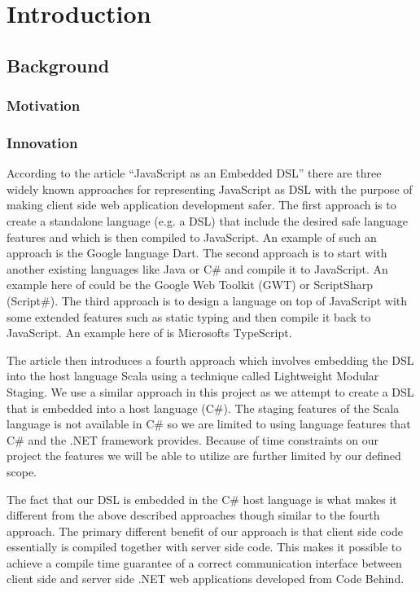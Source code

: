 \chapter{Introduction}

\section{Background}

	\subsection{Motivation}

	\subsection{Innovation}
		According to the article “JavaScript as an Embedded DSL” there are three widely known approaches for representing JavaScript as DSL with the purpose of making client side web application development safer. The first approach is to create a standalone language (e.g. a DSL) that include the desired safe language features and which is then compiled to JavaScript. An example of such an approach is the Google language Dart. The second approach is to start with another existing languages like Java or C\# and compile it to JavaScript. An example here of could be the Google Web Toolkit (GWT) or ScriptSharp (Script\#). The third approach is to design a language on top of JavaScript with some extended features such as static typing and then compile it back to JavaScript. An example here of is Microsofts TypeScript.

		The article then introduces a fourth approach which involves embedding the DSL into the host language Scala using a technique called Lightweight Modular Staging. We use a similar approach in this project as we attempt to create a DSL that is embedded into a host language (C\#). The staging features of the Scala language is not available in C\# so we are limited to using language features that C\# and the .NET framework provides. Because of time constraints on our project the features we will be able to utilize are further limited by our defined scope.

		The fact that our DSL is embedded in the C\# host language is what makes it different from the above described approaches though similar to the fourth approach. The primary different benefit of our approach is that client side code essentially is compiled together with server side code. This makes it possible to achieve a compile time guarantee of a correct communication interface between client side and server side .NET web applications developed from Code Behind.

